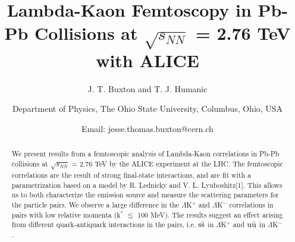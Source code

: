\documentclass[ALICE,manyauthors]{ALICE_analysis_notes}
\begin{document}
%
%
%
\begin{titlepage}
%
\PHnumber{} 
\PHdate{\today}

 \pagestyle{empty}
 \begin{landscape}

%
\title{Lambda-Kaon Femtoscopy in Pb-Pb Collisions at $\sqrt{s_{NN}}$ = 2.76 TeV with ALICE}
%
\author{J. T. Buxton and T. J. Humanic}
\author{
Department of Physics, The Ohio State University, Columbus, Ohio, USA\\
}
\author{Email: jesse.thomas.buxton@cern.ch}
\begin{abstract}
We present results from a femtoscopic analysis of Lambda-Kaon correlations in Pb-Pb collisions at $\sqrt{s_{NN}}$ = 2.76 TeV by the ALICE experiment at the LHC.
The femtoscopic correlations are the result of strong final-state interactions, and are fit with a parametrization based on a model by R. Lednicky and V. L. Lyuboshitz[1].
This allows us to both characterize the emission source and measure the scattering parameters for the particle pairs.
We observe a large difference in the $\Lambda$K$^{+}$ and $\Lambda$K$^{-}$ correlations in pairs with low relative momenta (k$^{*}$ $\lesssim$ 100 MeV).
The results suggest an effect arising from different quark-antiquark interactions in the pairs, i.e. $\rm s\bar{s}$ in $\Lambda$K$^{+}$ and $\rm u\bar{u}$ in $\Lambda$K$^{-}$.
\end{abstract}


 \end{landscape}
 \pagestyle{plain}


\end{titlepage}
\end{document}
